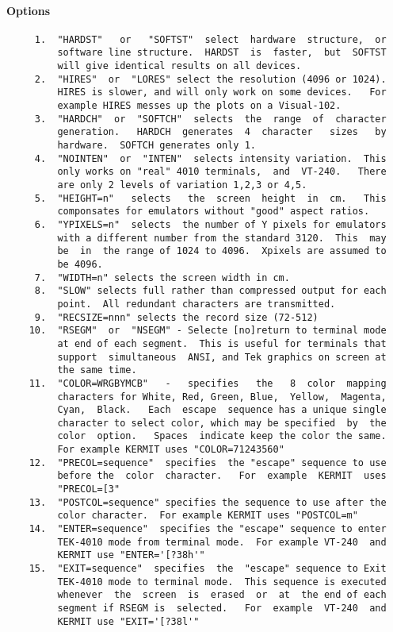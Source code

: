 \paragraph{Options}
\begin{verbatim}
     1.  "HARDST"   or   "SOFTST"  select  hardware  structure,  or
         software line structure.  HARDST  is  faster,  but  SOFTST
         will give identical results on all devices.  
     2.  "HIRES"  or  "LORES" select the resolution (4096 or 1024).
         HIRES is slower, and will only work on some devices.   For
         example HIRES messes up the plots on a Visual-102.  
     3.  "HARDCH"  or  "SOFTCH"  selects  the  range  of  character
         generation.   HARDCH  generates  4  character   sizes   by
         hardware.  SOFTCH generates only 1.  
     4.  "NOINTEN"  or  "INTEN"  selects intensity variation.  This
         only works on "real" 4010 terminals,  and  VT-240.   There
         are only 2 levels of variation 1,2,3 or 4,5.  
     5.  "HEIGHT=n"   selects   the  screen  height  in  cm.   This
         componsates for emulators without "good" aspect ratios.  
     6.  "YPIXELS=n"  selects  the number of Y pixels for emulators
         with a different number from the standard 3120.  This  may
         be  in  the range of 1024 to 4096.  Xpixels are assumed to
         be 4096.  
     7.  "WIDTH=n" selects the screen width in cm.  
     8.  "SLOW" selects full rather than compressed output for each
         point.  All redundant characters are transmitted.  
     9.  "RECSIZE=nnn" selects the record size (72-512) 
    10.  "RSEGM"  or  "NSEGM" - Selecte [no]return to terminal mode
         at end of each segment.  This is useful for terminals that
         support  simultaneous  ANSI, and Tek graphics on screen at
         the same time.  
    11.  "COLOR=WRGBYMCB"   -   specifies   the   8  color  mapping
         characters for White, Red, Green, Blue,  Yellow,  Magenta,
         Cyan,  Black.   Each  escape  sequence has a unique single
         character to select color, which may be specified  by  the
         color  option.   Spaces  indicate keep the color the same.
         For example KERMIT uses "COLOR=71243560" 
    12.  "PRECOL=sequence"  specifies  the "escape" sequence to use
         before the  color  character.   For  example  KERMIT  uses
         "PRECOL=[3" 
    13.  "POSTCOL=sequence" specifies the sequence to use after the
         color character.  For example KERMIT uses "POSTCOL=m" 
    14.  "ENTER=sequence"  specifies the "escape" sequence to enter
         TEK-4010 mode from terminal mode.  For example VT-240  and
         KERMIT use "ENTER='[?38h'" 
    15.  "EXIT=sequence"  specifies  the  "escape" sequence to Exit
         TEK-4010 mode to terminal mode.  This sequence is executed
         whenever  the  screen  is  erased  or  at  the end of each
         segment if RSEGM is  selected.   For  example  VT-240  and
         KERMIT use "EXIT='[?38l'" 
\end{verbatim}

